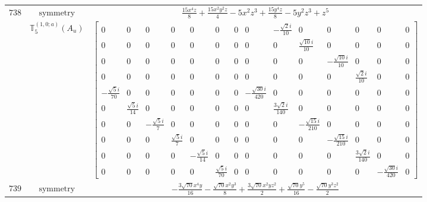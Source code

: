 \documentclass[fleqn,8pt,landscape]{jsarticle}
\begin{document}
\begin{longtable}{ccc}
$ 738 $ & $ \text{symmetry} $ & $ \frac{15 x^{4} z}{8} + \frac{15 x^{2} y^{2} z}{4} - 5 x^{2} z^{3} + \frac{15 y^{4} z}{8} - 5 y^{2} z^{3} + z^{5} $ \\
$  $ & $ \mathbb{T}_{5}^{(1,0;a)}(A_{u}) $ & $ \begin{bmatrix} 0 & 0 & 0 & 0 & 0 & 0 & 0 & 0 & - \frac{\sqrt{2} i}{10} & 0 & 0 & 0 & 0 & 0 \\ 0 & 0 & 0 & 0 & 0 & 0 & 0 & 0 & 0 & \frac{\sqrt{10} i}{10} & 0 & 0 & 0 & 0 \\ 0 & 0 & 0 & 0 & 0 & 0 & 0 & 0 & 0 & 0 & - \frac{\sqrt{10} i}{10} & 0 & 0 & 0 \\ 0 & 0 & 0 & 0 & 0 & 0 & 0 & 0 & 0 & 0 & 0 & \frac{\sqrt{2} i}{10} & 0 & 0 \\ - \frac{\sqrt{5} i}{70} & 0 & 0 & 0 & 0 & 0 & 0 & - \frac{\sqrt{30} i}{420} & 0 & 0 & 0 & 0 & 0 & 0 \\ 0 & \frac{\sqrt{5} i}{14} & 0 & 0 & 0 & 0 & 0 & 0 & \frac{3 \sqrt{2} i}{140} & 0 & 0 & 0 & 0 & 0 \\ 0 & 0 & - \frac{\sqrt{5} i}{7} & 0 & 0 & 0 & 0 & 0 & 0 & - \frac{\sqrt{15} i}{210} & 0 & 0 & 0 & 0 \\ 0 & 0 & 0 & \frac{\sqrt{5} i}{7} & 0 & 0 & 0 & 0 & 0 & 0 & - \frac{\sqrt{15} i}{210} & 0 & 0 & 0 \\ 0 & 0 & 0 & 0 & - \frac{\sqrt{5} i}{14} & 0 & 0 & 0 & 0 & 0 & 0 & \frac{3 \sqrt{2} i}{140} & 0 & 0 \\ 0 & 0 & 0 & 0 & 0 & \frac{\sqrt{5} i}{70} & 0 & 0 & 0 & 0 & 0 & 0 & - \frac{\sqrt{30} i}{420} & 0 \end{bmatrix} $ \\ \hline
$ 739 $ & $ \text{symmetry} $ & $ - \frac{3 \sqrt{70} x^{4} y}{16} - \frac{\sqrt{70} x^{2} y^{3}}{8} + \frac{3 \sqrt{70} x^{2} y z^{2}}{2} + \frac{\sqrt{70} y^{5}}{16} - \frac{\sqrt{70} y^{3} z^{2}}{2} $ \\

\end{longtable}
\end{document}
